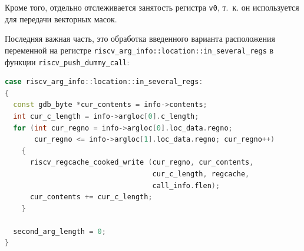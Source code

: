Кроме того, отдельно отслеживается занятость регистра \texttt{v0}, т.~к. он
используется для передачи векторных масок.

Последняя важная часть, это обработка введенного варианта расположения
переменной на регистре \texttt{riscv\_arg\_info::location::in\_several\_regs}
в функции \texttt{riscv\_push\_dummy\_call}:

\begin{samepage}
\begin{lstlisting}[language=C++, caption=Запись необходимого значения в соответствующие регистры в кэше, 
		label=lst:switch:in_several_regs, breaklines=false]
case riscv_arg_info::location::in_several_regs:
{
  const gdb_byte *cur_contents = info->contents;
  int cur_c_length = info->argloc[0].c_length;
  for (int cur_regno = info->argloc[0].loc_data.regno;
       cur_regno <= info->argloc[1].loc_data.regno; cur_regno++)
    {
      riscv_regcache_cooked_write (cur_regno, cur_contents,
                                   cur_c_length, regcache,
                                   call_info.flen);
      cur_contents += cur_c_length;
    }

  second_arg_length = 0;
}
\end{lstlisting}
\end{samepage}







\newpage